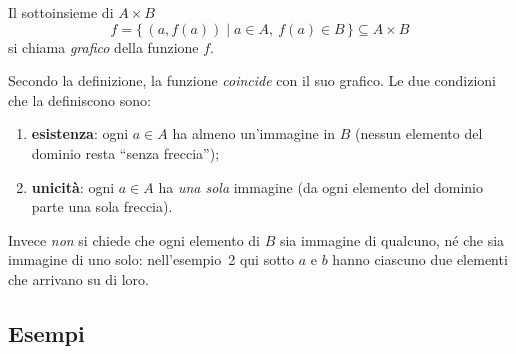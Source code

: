 \documentclass[11pt,a4paper]{article}
\begin{document}
Il sottoinsieme di $A \times B$
\[
f = \{\, (a, f(a)) \mid a \in A,\ f(a) \in B \,\} \subseteq A \times B
\]
si chiama \emph{grafico} della funzione $f$.

\begin{osservazione}
Secondo la definizione, la funzione \emph{coincide} con il suo grafico.
Le due condizioni che la definiscono sono:
\begin{enumerate}
    \item \textbf{esistenza}: ogni $a \in A$ ha almeno un'immagine in $B$
          (nessun elemento del dominio resta ``senza freccia'');
    \item \textbf{unicità}: ogni $a \in A$ ha \emph{una sola} immagine
          (da ogni elemento del dominio parte una sola freccia).
\end{enumerate}
Invece \emph{non} si chiede che ogni elemento di $B$ sia immagine di
qualcuno, né che sia immagine di uno solo: nell'esempio~2 qui sotto $a$ e
$b$ hanno ciascuno due elementi che arrivano su di loro.
\end{osservazione}

\subsection{Esempi}
\end{document}
